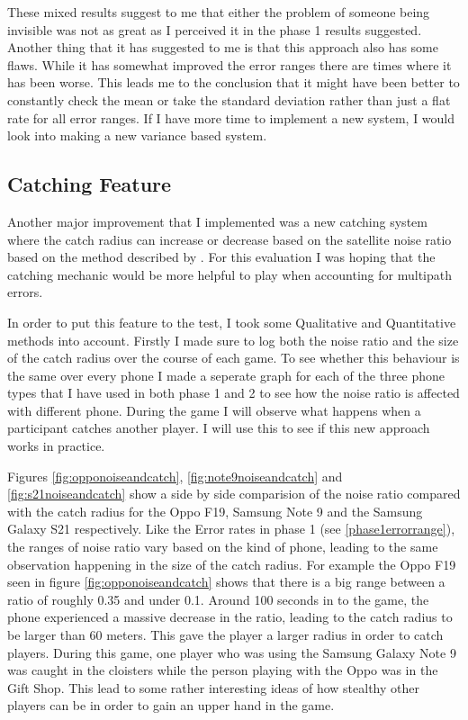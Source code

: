 \documentclass{l4proj}
\begin{document}
These mixed results suggest to me that either the problem of someone being invisible was not as great as I perceived it in
the phase 1 results suggested. Another thing that it has suggested to me is that this approach also has some flaws. While
it has somewhat improved the error ranges there are times where it has been worse. This leads me to the conclusion that it might
have been better to constantly check the mean or take the standard deviation rather than just a flat rate for all error ranges.
If I have more time to implement a new system, I would look into making a new variance based system.

\subsection{Catching Feature}
Another major improvement that I implemented was a new catching system where the catch radius can increase or decrease based
on the satellite noise ratio based on the method described by \cite{uberGPS}. For this evaluation I was hoping that the catching mechanic would be more helpful to play when
accounting for multipath errors.

In order to put this feature to the test, I took some Qualitative and Quantitative methods into account. Firstly I made sure to log both
the noise ratio and the size of the catch radius over the course of each game. To see whether this behaviour is the same over every phone
I made a seperate graph for each of the three phone types that I have used in both phase 1 and 2 to see how the noise ratio is affected
with different phone. During the game I will observe what happens when a participant catches another player. I will use this to see if
this new approach works in practice.

Figures \ref{fig:opponoiseandcatch}, \ref{fig:note9noiseandcatch} and \ref{fig:s21noiseandcatch} show a side by side comparision of the
noise ratio compared with the catch radius for the Oppo F19, Samsung Note 9 and the Samsung Galaxy S21 respectively. Like the Error rates in
phase 1 (see \ref{phase1errorrange}), the ranges of noise ratio vary based on the kind of phone, leading to the same observation happening in
the size of the catch radius. For example the Oppo F19 seen in figure \ref{fig:opponoiseandcatch} shows that there is a big range between a ratio
of roughly 0.35 and under 0.1. Around 100 seconds in to the game, the phone experienced a massive decrease in the ratio, leading to the catch radius
to be larger than 60 meters. This gave the player a larger radius in order to catch players. During this game, one player who was using the Samsung
Galaxy Note 9 was caught in the cloisters while the person playing with the Oppo was in the Gift Shop. This lead to some rather interesting ideas
of how stealthy other players can be in order to gain an upper hand in the game.
\end{document}
